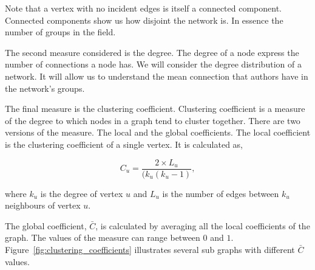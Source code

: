 \documentclass{article}
\theoremstyle{definition}
\begin{document}
Note that a vertex with no incident edges is itself a connected component.
Connected components show us how disjoint the network is. In essence the number
of groups in the field.

The second measure considered is the degree. The degree of a node express
the number of connections a node has. We will consider the degree distribution
of a network. It will allow us to understand the mean connection that authors
have in the network's groups.

The final measure is the clustering coefficient. Clustering coefficient is a
measure of the degree to which nodes in a graph tend to cluster together. There
are two versions of the measure. The local and the global coefficients. The local
coefficient is the clustering coefficient of a single vertex. It is calculated as,

\[C_u = \frac{2 \times L_u}{(k_u (k_u - 1)},\]

where \(k_u\) is the degree of vertex \(u\) and \(L_u\) is the number of edges
between \(k_u\) neighbours of vertex \(u\).

The global coefficient, \(\bar{C}\), is calculated by averaging all the local
coefficients of the graph. The values of the measure can range between \(0\) and
\(1\). Figure~\ref{fig:clustering_coefficients} illustrates several sub graphs
with different \(\bar{C}\) values.
\end{document}
